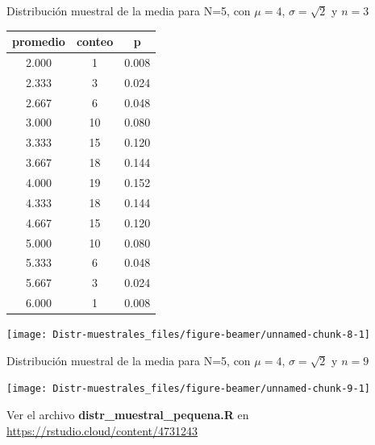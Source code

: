 \documentclass[
  10pt,
  ignorenonframetext,
]{beamer}
\begin{document}
\begin{frame}{}
\protect\hypertarget{section-18}{}
\begin{block}{Distribución muestral de la media para N=5, con \(\mu=4\),
\(\sigma=\sqrt{2}\) y \(n=3\)}
\protect\hypertarget{distribuciuxf3n-muestral-de-la-media-para-n5-con-mu4-sigmasqrt2-y-n3}{}
\begin{minipage}{\textwidth}

\begin{multicols}{2}


\begin{tabular}{c|c|c}
\hline
promedio & conteo & p\\
\hline
2.000 & 1 & 0.008\\
\hline
2.333 & 3 & 0.024\\
\hline
2.667 & 6 & 0.048\\
\hline
3.000 & 10 & 0.080\\
\hline
3.333 & 15 & 0.120\\
\hline
3.667 & 18 & 0.144\\
\hline
4.000 & 19 & 0.152\\
\hline
4.333 & 18 & 0.144\\
\hline
4.667 & 15 & 0.120\\
\hline
5.000 & 10 & 0.080\\
\hline
5.333 & 6 & 0.048\\
\hline
5.667 & 3 & 0.024\\
\hline
6.000 & 1 & 0.008\\
\hline
\end{tabular}



\begin{flushright}\texttt{[image: Distr-muestrales\_files/figure-beamer/unnamed-chunk-8-1]} \end{flushright}



\end{multicols}

\end{minipage}
\end{block}
\end{frame}

\begin{frame}{}
\protect\hypertarget{section-19}{}
\begin{block}{Distribución muestral de la media para N=5, con \(\mu=4\),
\(\sigma=\sqrt{2}\) y \(n=9\)}
\protect\hypertarget{distribuciuxf3n-muestral-de-la-media-para-n5-con-mu4-sigmasqrt2-y-n9}{}
\begin{center}\texttt{[image: Distr-muestrales\_files/figure-beamer/unnamed-chunk-9-1]} \end{center}

Ver el archivo \textbf{distr\_muestral\_pequena.R} en
\url{https://rstudio.cloud/content/4731243}
\end{block}
\end{frame}
\end{document}
